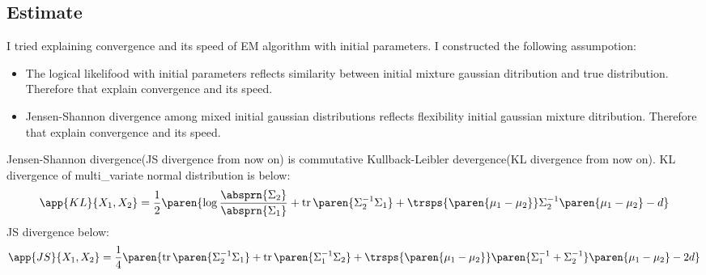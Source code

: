 \documentclass[uplatex]{jsarticle}
\newcommand{\tr}{\mathop{\mathrm{tr}}}
\begin{document}
    \subsection{Estimate}
      \indent
	I tried explaining convergence and its speed of EM algorithm with initial parameters. I constructed the following assumpotion:
      \par
      \indent
	\begin{shadebox}
	  \begin{itemize}
	    \item The logical likelifood with initial parameters reflects similarity between initial mixture gaussian ditribution and true distribution. Therefore that explain convergence and its speed.
	    \item Jensen-Shannon divergence among mixed initial gaussian distributions reflects flexibility initial gaussian mixture ditribution. Therefore that explain convergence and its speed.
	  \end{itemize}
	\end{shadebox}
      \par
      \indent
	Jensen-Shannon divergence(JS divergence from now on) is commutative Kullback-Leibler devergence(KL divergence from now on). KL divergence of multi\_variate normal distribution is below:
	\begin{align}
	  \app{KL}{X_1, X_2} = \frac{1}{2}\paren{\log\frac{\absprn{\Sigma_2}}{\absprn{\Sigma_1}} + \tr\paren{\Sigma_2^{-1}\Sigma_1} + \trsps{\paren{\mu_1 - \mu_2}}\Sigma_2^{-1}\paren{\mu_1 - \mu_2} - d}
	\end{align}
	JS divergence below:
	\begin{align}
	  \app{JS}{X_1, X_2} = \frac{1}{4}\paren{\tr\paren{\Sigma_2^{-1}\Sigma_1} + \tr\paren{\Sigma_1^{-1}\Sigma_2} + \trsps{\paren{\mu_1 - \mu_2}}\paren{\Sigma_1^{-1} + \Sigma_2^{-1}}\paren{\mu_1 - \mu_2} - 2d}
	\end{align}
      \par
\end{document}
